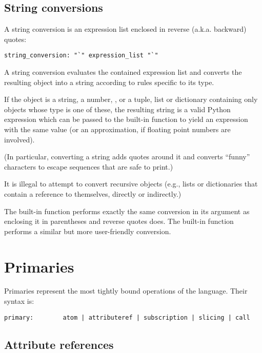 \subsection{String conversions\label{string-conversions}}

A string conversion is an expression list enclosed in reverse (a.k.a.
backward) quotes:

\begin{verbatim}
string_conversion: "`" expression_list "`"
\end{verbatim}

A string conversion evaluates the contained expression list and
converts the resulting object into a string according to rules
specific to its type.

If the object is a string, a number, , or a tuple, list or
dictionary containing only objects whose type is one of these, the
resulting string is a valid Python expression which can be passed to
the built-in function  to yield an expression with the
same value (or an approximation, if floating point numbers are
involved).

(In particular, converting a string adds quotes around it and converts
``funny'' characters to escape sequences that are safe to print.)

It is illegal to attempt to convert recursive objects (e.g., lists or
dictionaries that contain a reference to themselves, directly or
indirectly.)

The built-in function  performs exactly the same
conversion in its argument as enclosing it in parentheses and reverse
quotes does.  The built-in function  performs a
similar but more user-friendly conversion.

\section{Primaries\label{primaries}}

Primaries represent the most tightly bound operations of the language.
Their syntax is:

\begin{verbatim}
primary:        atom | attributeref | subscription | slicing | call
\end{verbatim}

\subsection{Attribute references\label{attribute-references}}

